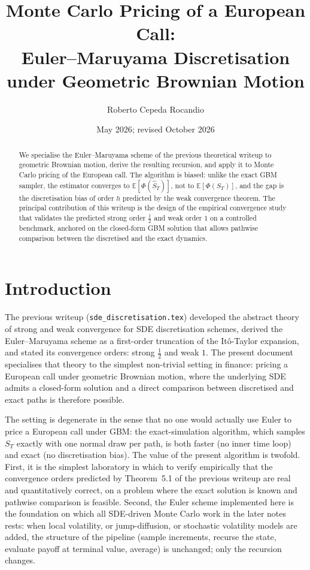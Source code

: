 \documentclass[11pt,a4paper]{article}
\title{Monte Carlo Pricing of a European Call:\\
       Euler--Maruyama Discretisation under Geometric Brownian Motion}
\author{Roberto Cepeda Rocandio}
\date{May 2026; revised October 2026}
\theoremstyle{plain}
\theoremstyle{definition}
\theoremstyle{remark}
\begin{document}
\maketitle

\begin{abstract}
We specialise the Euler--Maruyama scheme of the previous theoretical
writeup to geometric Brownian motion, derive the resulting recursion,
and apply it to Monte Carlo pricing of the European call. The
algorithm is biased: unlike the exact GBM sampler, the
estimator converges to $\mathbb{E}[\Phi(\hat S_T)]$, not to
$\mathbb{E}[\Phi(S_T)]$, and the gap is the discretisation bias of
order $h$ predicted by the weak convergence theorem. The principal
contribution of this writeup is the design of the empirical
convergence study that validates the predicted strong order
$\tfrac{1}{2}$ and weak order $1$ on a controlled benchmark, anchored
on the closed-form GBM solution that allows pathwise comparison
between the discretised and the exact dynamics.
\end{abstract}

\tableofcontents

\section{Introduction}
\label{sec:intro}

The previous writeup (\texttt{sde\_discretisation.tex}) developed the
abstract theory of strong and weak convergence for SDE discretisation
schemes, derived the Euler--Maruyama scheme as a first-order
truncation of the It\^o-Taylor expansion, and stated its convergence
orders: strong $\tfrac{1}{2}$ and weak $1$. The present document
specialises that theory to the simplest non-trivial setting in
finance: pricing a European call under geometric Brownian motion,
where the underlying SDE admits a closed-form solution and a direct
comparison between discretised and exact paths is therefore possible.

The setting is degenerate in the sense that no one would actually use
Euler to price a European call under GBM: the exact-simulation algorithm,
which samples $S_T$ exactly with one normal draw per path, is both
faster (no inner time loop) and exact (no discretisation bias). The
value of the present algorithm is twofold. First, it is the simplest
laboratory in which to verify empirically that the convergence orders
predicted by Theorem~5.1 of the previous writeup are real and
quantitatively correct, on a problem where the exact solution is
known and pathwise comparison is feasible. Second, the Euler scheme
implemented here is the foundation on which all SDE-driven Monte
Carlo work in the later notes rests: when local volatility,
or jump-diffusion, or stochastic volatility models are
added, the structure of the pipeline (sample increments, recurse the
state, evaluate payoff at terminal value, average) is unchanged; only
the recursion changes.
\end{document}
